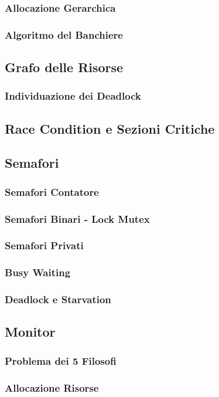 \documentclass[a4paper]{article}
\begin{document}
\subsubsection*{Allocazione Gerarchica}
\subsubsection*{Algoritmo del Banchiere}
\subsection{Grafo delle Risorse}
\subsubsection*{Individuazione dei Deadlock}
\subsection{Race Condition e Sezioni Critiche}
\subsection{Semafori}
\subsubsection*{Semafori Contatore}
\subsubsection*{Semafori Binari - Lock Mutex}
\subsubsection*{Semafori Privati}
\subsubsection*{Busy Waiting}
\subsubsection*{Deadlock e Starvation}
\subsection{Monitor}
\subsubsection*{Problema dei 5 Filosofi}
\subsubsection*{Allocazione Risorse}
\end{document}
